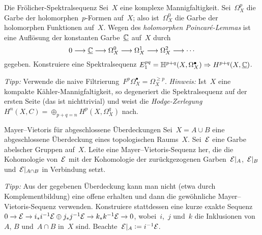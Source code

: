 \documentclass{uebblatt}
\begin{document}
\begin{aufgabe}{Die Frölicher-Spektralsequenz}
Sei~$X$ eine komplexe Mannigfaltigkeit. Sei~$\Omega_X^p$ die Garbe der
holomorphen~$p$-Formen auf~$X$; also ist~$\Omega_X^0$ die Garbe der holomorphen
Funktionen auf~$X$. Wegen des \emph{holomorphen Poincaré-Lemmas} ist eine
Auflösung der konstanten Garbe~$\underline{\mathbb{C}}$ auf~$X$ durch
\[ 0 \longrightarrow \underline{\mathbb{C}} \longrightarrow \Omega_X^0 \longrightarrow \Omega_X^1 \longrightarrow \Omega_X^2 \longrightarrow \cdots \]
gegeben. Konstruiere eine Spektralsequenz $E_1^{pq} = \mathbb{H}^{p+q}(X,
\Omega_X^\bullet) \Rightarrow H^{p+q}(X,\underline{\mathbb{C}})$.

{\tiny\emph{Tipp:} Verwende die naive Filtrierung~$F^p \Omega_X^\bullet =
\Omega_X^{\geq p}$. \emph{Hinweis:} Ist~$X$ eine kompakte
Kähler-Mannigfaltigkeit, so degeneriert die Spektralsequenz auf der ersten
Seite (das ist nichttrivial) und weist die \emph{Hodge-Zerlegung} $H^n(X,C) = \oplus_{p+q=n}
H^p(X,\Omega_X^q)$ nach.\par}
\end{aufgabe}

\begin{aufgabe}{Mayer--Vietoris für abgeschlossene Überdeckungen}
Sei~$X = A \cup B$ eine abgeschlossene Überdeckung eines topologischen
Raums~$X$. Sei~$\mathcal{E}$ eine Garbe abelscher Gruppen auf~$X$. Leite eine
Mayer--Vietoris-Sequenz her, die die Kohomologie von~$\mathcal{E}$ mit der Kohomologie
der zurückgezogenen Garben~$\mathcal{E}|_A$,~$\mathcal{E}|_B$ und~$\mathcal{E}|_{A \cap B}$ in Verbindung
setzt.

{\tiny\emph{Tipp:} Aus der gegebenen Überdeckung kann man nicht (etwa durch
Komplementbildung) eine offene erhalten und dann die gewöhnliche
Mayer--Vietoris-Sequenz verwenden. Konstruiere stattdessen eine kurze exakte
Sequenz~$0 \to \mathcal{E} \to i_* i^{-1} \mathcal{E} \oplus j_* j^{-1} \mathcal{E} \to k_* k^{-1} \mathcal{E} \to
0$, wobei~$i$,~$j$ und~$k$ die Inklusionen von~$A$, $B$ und~$A \cap B$ in~$X$
sind. Beachte~$\mathcal{E}|_A \vcentcolon= i^{-1} \mathcal{E}$.\par}
\end{aufgabe}
\end{document}
